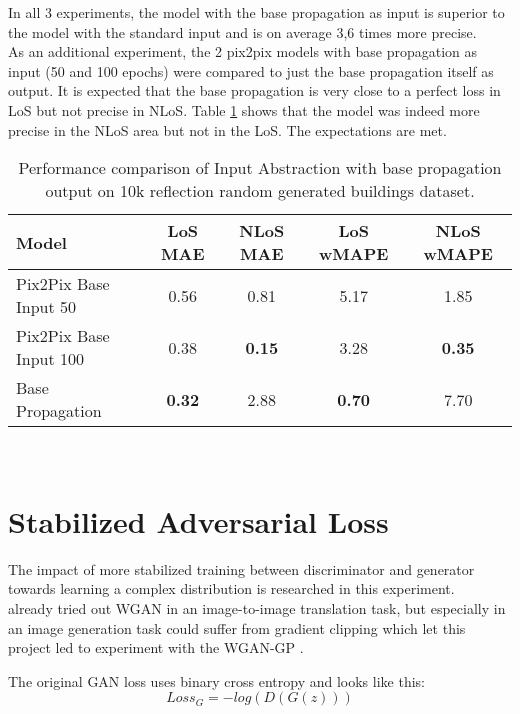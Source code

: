 		In all 3 experiments, the model with the base propagation as input is superior to the model with the standard input and is on average 3,6 times more precise.\\
		As an additional experiment, the 2 pix2pix models with base propagation as input (50 and 100 epochs) were compared to just the base propagation itself as output. It is expected that the base propagation is very close to a perfect loss in LoS but not precise in NLoS. Table \ref{tab:performance_input_base} shows that the model was indeed more precise in the NLoS area but not in the LoS. The expectations are met.
		\begin{table}[h!]
			\centering
			\begin{tabular}{|l|c|c|c|c|}
				\hline
				\textbf{Model} & \textbf{LoS MAE} & \textbf{NLoS MAE} & \textbf{LoS wMAPE} & \textbf{NLoS wMAPE} \\
				\hline
				Pix2Pix Base Input 50 & 0.56 & 0.81 & 5.17 & 1.85 \\
				Pix2Pix Base Input 100 & 0.38 & \textbf{0.15} & 3.28 & \textbf{0.35} \\
				Base Propagation & \textbf{0.32} & 2.88 & \textbf{0.70} & 7.70 \\
				\hline
			\end{tabular}
			\caption{Performance comparison of Input Abstraction with base propagation output on 10k reflection random generated buildings dataset.}
			\label{tab:performance_input_base}
		\end{table}
		\\
		
	
	\section{Stabilized Adversarial Loss}
	\label{sec:experiments-stabilized_adversarial_loss}
		The impact of more stabilized training between discriminator and generator towards learning a complex distribution is researched in this experiment.\\
		 already tried out WGAN in an image-to-image translation task, but especially in an image generation task could suffer from gradient clipping which let this project led to experiment with the WGAN-GP \cite{gulrajani_improved_2017}.
		
		The original GAN loss uses binary cross entropy and looks like this:
		\begin{equation}
			Loss_G = -log( D( G(z) ) ) 
		\end{equation}
		
